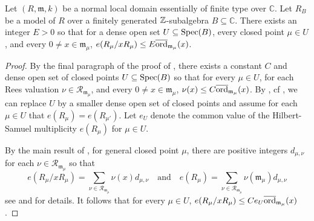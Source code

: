 \documentclass[12pt]{amsart}
\numberwithin{equation}{theorem}
\theoremstyle{plain}
\newcommand{\fm}{\mathfrak{m}}
\newcommand{\CC}{\mathbb{C}}
\begin{document}
\begin{proposition}
    \label{prop: E in mod p reduction}
    Let $(R,\fm,k)$ be a normal local domain essentially of finite type over $\CC$. Let $R_B$ be a model of $R$ over a finitely generated $\mbox{$\mathbb{Z}$}$-subalgebra $B\subseteq \CC$. There exists an integer $E>0$ so that for a dense open set $U\subseteq \operatorname{{Spec}}(B)$, every closed point $\mu\in U$, and every $0\not=x\in\fm_\mu$, $e(R_\mu/xR_{\mu})\leq E\overline{\ord}_{\fm_\mu}(x)$.
\end{proposition}
\begin{proof}
    By the final paragraph of the proof of \cite[Lemma~4.14]{TY26}, there exists a constant $C$ and dense open set of closed points $U\subseteq \operatorname{{Spec}}(B)$ so that for every $\mu\in U$, for each Rees valuation $\nu\in\mathcal{R}_{\fm_{\mu}}$, and every $0\not=x\in\fm_{\mu}$, $\nu(x)\leq C\overline{\ord}_{\fm_{\mu}}(x)$. By \cite[Proposition~3.1]{Lipman1982}, cf \cite[Theorem~3.4 and Corollary~3.5]{Smirnov2020}, we can replace $U$ by a smaller dense open set of closed points and assume for each $\mu\in U$ that $e(R_{\mu}) = e(R_{{\mu'}})$. Let $e_U$ denote the common value of the Hilbert-Samuel multiplicity $e(R_{\mu})$ for $\mu\in U$.

    By the main result of \cite{Rees1961}, for general closed point $\mu$, there are positive integers $d_{\mu,\nu}$ for each $\nu\in\mathcal{R}_{\fm_{\mu}}$ so that
    \[
    e(R_{\mu}/xR_{\mu}) = \sum_{\nu\in \mathcal{R}_{\fm_\mu}}\nu(x)d_{\mu,\nu} \quad \mbox{and} \quad e(R_{\mu}) = \sum_{\nu\in \mathcal{R}_{\fm_\mu}}\nu(\fm_{\mu})d_{\mu,\nu}
    \]
    see \cite[Theorem~2.8 and Corollary 2.9]{Polstra2026} and \cite[Theorem~1.1]{CutkoskyMontano2025} for details. It follows that for every $\mu\in U$, $e(R_{\mu}/xR_{\mu})\leq Ce_U\overline{\ord}_{\fm_{\mu}}(x)$.
\end{proof}
\end{document}
